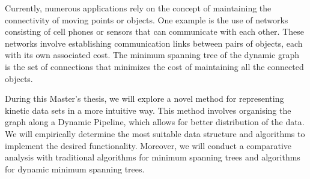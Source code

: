 \documentclass[12pt, openany]{article}
\begin{document}
Currently, numerous applications rely on the concept of maintaining the connectivity of moving points or objects. One example is the use of networks consisting of cell phones or sensors that can communicate with each other. These networks involve establishing communication links between pairs of objects, each with its own associated cost. The minimum spanning tree of the dynamic graph is the set of connections that minimizes the cost of maintaining all the connected objects.

During this Master's thesis, we will explore a novel method for representing kinetic data sets in a more intuitive way. This method involves organising the graph along a Dynamic Pipeline, which allows for better distribution of the data. We will empirically determine the most suitable data structure and algorithms to implement the desired functionality. Moreover, we will conduct a comparative analysis with traditional algorithms for minimum spanning trees and algorithms for dynamic minimum spanning trees.
\end{document}
